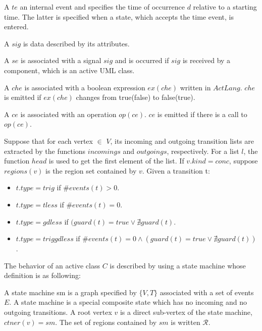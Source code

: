 \begin{definition} A  $te$ an internal event and specifies the time of occurrence $d$ relative to a starting time. The latter is specified when a state, which accepts the time event, is entered. 
\end{definition}

\begin{definition} A  $sig$ is data described by its attributes. 
\end{definition}

\begin{definition} A  $se$ is associated with a signal $sig$ and is occurred if $sig$ is received by a component, which is an active UML class. 
\end{definition}	

\begin{definition}
	A  $che$ is associated with a boolean expression $ex(che)$ written in $ActLang$. $che$ is emitted if $ex(che)$ changes from true(false) to false(true).
\end{definition}

\begin{definition}
	A  $ce$ is associated with an operation $op(ce)$. $ce$ is emitted if there is a call to $op(ce)$.
\end{definition}

Suppose that for each vertex  $\in$ $V$, its incoming and outgoing transition lists are extracted by the functions $incomings$ and $outgoings$, respectively. For a list $l$, the function $head$ is used to get the first element of the list. If $v.kind = conc$, suppose $regions(v)$ is the region set contained by $v$. Given a transition t:
\begin{itemize}
	\item $t.type = trig$ if $\#events(t) > 0$.
	\item $t.type = tless$ if $\#events(t) = 0$.
	\item $t.type = gdless$ if $(guard(t) = true \vee \nexists guard(t)$.
	\item $t.type = triggdless$ if $\#events(t) = 0 \wedge (guard(t) = true \vee \nexists guard(t))$.
\end{itemize}

The behavior of an active class $C$ is described by using a state machine whose definition is as following:	

\begin{definition} A state machine sm is a graph specified by $\{V, T\}$ associated with a set of events $E$. A state machine is a special composite state which has no incoming and no outgoing transitions. A root vertex $v$ is a direct sub-vertex of the state machine, $ctner(v) = sm$. The set of regions contained by $sm$ is written $\mathcal{R}$.
\end{definition}	

